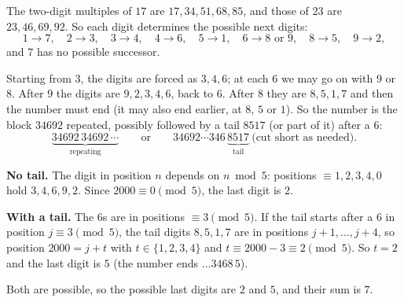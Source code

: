 The two-digit multiples of $17$ are $17,34,51,68,85$, and those of $23$ are $23,46,69,92$. So each digit determines the possible next digits:
\[1\to7,\quad 2\to3,\quad 3\to4,\quad 4\to6,\quad 5\to1,\quad 6\to8\text{ or }9,\quad 8\to5,\quad 9\to2,\]
and $7$ has no possible successor.

Starting from $3$, the digits are forced as $3,4,6$; at each $6$ we may go on with $9$ or $8$. After $9$ the digits are $9,2,3,4,6$, back to $6$. After $8$ they are $8,5,1,7$ and then the number must end (it may also end earlier, at $8$, $5$ or $1$). So the number is the block $34692$ repeated, possibly followed by a tail $8517$ (or part of it) after a $6$:
\[\underbrace{34692\,34692\,\cdots}_{\text{repeating}}\qquad\text{or}\qquad 34692\cdots346\,\underbrace{8517}_{\text{tail}}\ \text{(cut short as needed)}.\]

\textbf{No tail.} The digit in position $n$ depends on $n\bmod5$: positions $\equiv1,2,3,4,0$ hold $3,4,6,9,2$. Since $2000\equiv0\pmod5$, the last digit is $2$.

\textbf{With a tail.} The $6$s are in positions $\equiv3\pmod5$. If the tail starts after a $6$ in position $j\equiv3\pmod5$, the tail digits $8,5,1,7$ are in positions $j+1,\ldots,j+4$, so position $2000=j+t$ with $t\in\{1,2,3,4\}$ and $t\equiv2000-3\equiv2\pmod5$. So $t=2$ and the last digit is $5$ (the number ends $\ldots3468\,5$).

Both are possible, so the possible last digits are $2$ and $5$, and their sum is $\boxed{7}$.
